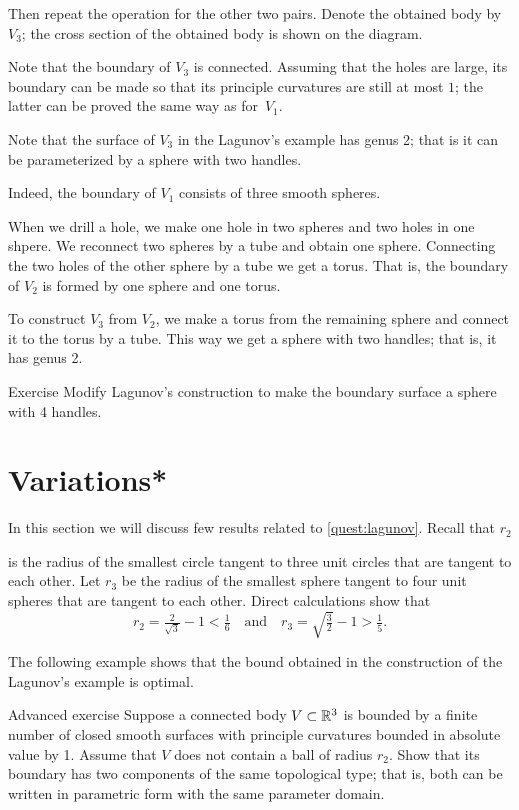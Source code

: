 Then repeat the operation for the other two pairs.
Denote the obtained body by $V_3$; the cross section of the obtained body is shown on the diagram.

Note that the boundary of $V_3$ is connected.
Assuming that the holes are large, its boundary can be made so that its principle curvatures are still at most $1$; the latter can be proved the same way as for~$V_1$.
\qeds


Note that the surface of $V_3$ in the Lagunov's example has genus 2; that is it can be parameterized by a sphere with two handles.

Indeed, the boundary of $V_1$ consists of three smooth spheres.

When we drill a hole, we make one hole in two spheres and two holes in one shpere.
We reconnect two spheres by a tube and obtain one sphere.
Connecting the two holes of the other sphere by a tube we get a torus.
That is, the boundary of $V_2$ is formed by one sphere and one torus.

To construct $V_3$ from $V_2$, we make a torus from the remaining sphere and connect it to the torus by a tube.
This way we get a sphere with two handles; that is, it has genus 2.

\begin{thm}{Exercise}\label{ex:lagunov-genus4}
Modify Lagunov's construction to make the boundary surface a sphere with 4 handles.
\end{thm}

\section*{Variations*}

In this section we will discuss few results related to \ref{quest:lagunov}.
Recall that $r_2$

is the radius of the smallest circle tangent to three unit circles that are tangent to each other.
Let $r_3$
be the radius of the smallest sphere tangent to four unit spheres that are tangent to each other.
Direct calculations show that 
\[r_2=\tfrac2{\sqrt{3}}-1< \tfrac16\quad\text{and}\quad r_3=\sqrt{\tfrac32}-1>\tfrac15.\]

The following example shows that the bound obtained in the construction of the Lagunov's example is optimal.

\begin{thm}{Advanced exercise}
Suppose a connected body $V\subset \mathbb{R}^3$ is bounded by a finite number of closed smooth surfaces with principle curvatures bounded in absolute value by 1.
Assume that $V$ does not contain a ball of radius $r_2$.
Show that its boundary has two components of the same topological type; 
that is, both can be written in parametric form with the same parameter domain. 
\end{thm}

